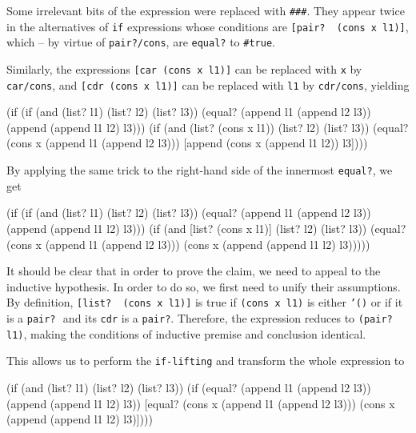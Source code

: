 Some irrelevant bits of the expression were replaced with \texttt{\#\#\#}. They
appear twice in the alternatives of \texttt{if} expressions whose conditions
are \texttt{[pair?\,\,(cons x l1)]}, which -- by virtue of
\texttt{pair?/cons}, are \texttt{equal?} to \texttt{\#true}.

Similarly, the expressions \texttt{[car (cons x l1)]} can be replaced with
\texttt{x} by \texttt{car/cons}, and \texttt{[cdr (cons x l1)]} can be
replaced with \texttt{l1} by \texttt{cdr/cons}, yielding

\begin{Snippet}
  (if (if (and (list? l1) (list? l2) (list? l3))
          (equal? (append l1 (append l2 l3))
                  (append (append l1 l2) l3)))
      (if (and (list? (cons x l1)) (list? l2) (list? l3))
          (equal? (cons x (append l1 (append l2 l3)))
                  [append (cons x (append l1 l2)) l3])))
\end{Snippet}

By applying the same trick to the right-hand side of the innermost
\texttt{equal?}, we get

\begin{Snippet}
  (if (if (and (list? l1) (list? l2) (list? l3))
          (equal? (append l1 (append l2 l3))
                  (append (append l1 l2) l3)))
      (if (and [list? (cons x l1)] (list? l2) (list? l3))
          (equal? (cons x (append l1 (append l2 l3)))
                  (cons x (append (append l1 l2) l3)))))
\end{Snippet}

It should be clear that in order to prove the claim, we need to appeal
to the inductive hypothesis. In order to do so, we first need to unify
their assumptions. By definition, \texttt{[list?\,\,(cons x l1)]} is true
if \texttt{(cons x l1)} is either \texttt{'()} or if it is a \texttt{pair?}\,\,
and its \texttt{cdr} is a \texttt{pair?}. Therefore, the expression
reduces to \texttt{(pair?\,\,l1)}, making the conditions of inductive
premise and conclusion identical.

This allows us to perform the \texttt{if-lifting} and transform the whole
expression to

\begin{Snippet}
  (if (and (list? l1) (list? l2) (list? l3))
      (if (equal? (append l1 (append l2 l3))
                  (append (append l1 l2) l3))
          [equal? (cons x (append l1 (append l2 l3)))
                  (cons x (append (append l1 l2) l3)])))
\end{Snippet}

